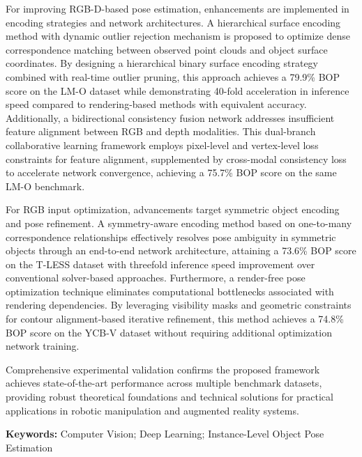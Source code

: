 \par For improving RGB-D-based pose estimation, enhancements are implemented in encoding strategies and network architectures. A hierarchical surface encoding method with dynamic outlier rejection mechanism is proposed to optimize dense correspondence matching between observed point clouds and object surface coordinates. By designing a hierarchical binary surface encoding strategy combined with real-time outlier pruning, this approach achieves a 79.9\% BOP score on the LM-O dataset while demonstrating 40-fold acceleration in inference speed compared to rendering-based methods with equivalent accuracy. Additionally, a bidirectional consistency fusion network addresses insufficient feature alignment between RGB and depth modalities. This dual-branch collaborative learning framework employs pixel-level and vertex-level loss constraints for feature alignment, supplemented by cross-modal consistency loss to accelerate network convergence, achieving a 75.7\% BOP score on the same LM-O benchmark.

\par For RGB input optimization, advancements target symmetric object encoding and pose refinement. A symmetry-aware encoding method based on one-to-many correspondence relationships effectively resolves pose ambiguity in symmetric objects through an end-to-end network architecture, attaining a 73.6\% BOP score on the T-LESS dataset with threefold inference speed improvement over conventional solver-based approaches. Furthermore, a render-free pose optimization technique eliminates computational bottlenecks associated with rendering dependencies. By leveraging visibility masks and geometric constraints for contour alignment-based iterative refinement, this method achieves a 74.8\% BOP score on the YCB-V dataset without requiring additional optimization network training.

\par Comprehensive experimental validation confirms the proposed framework achieves state-of-the-art performance across multiple benchmark datasets, providing robust theoretical foundations and technical solutions for practical applications in robotic manipulation and augmented reality systems.
\par \textbf{Keywords:} Computer Vision; Deep Learning; Instance-Level Object Pose Estimation
